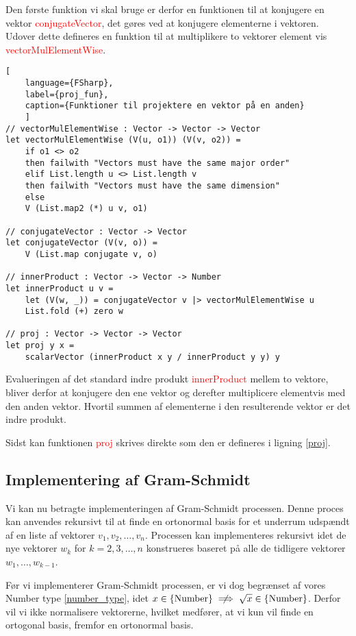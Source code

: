 Den første funktion vi skal bruge er derfor en funktionen til at konjugere en vektor \textcolor{red}{conjugateVector}, det gøres ved at konjugere elementerne i vektoren. Udover dette defineres en funktion til at multiplikere to vektorer element vis \textcolor{red}{vectorMulElementWise}. 

\begin{lstlisting}[
    language={FSharp}, 
    label={proj_fun}, 
    caption={Funktioner til projektere en vektor på en anden}
    ]
// vectorMulElementWise : Vector -> Vector -> Vector
let vectorMulElementWise (V(u, o1)) (V(v, o2)) =
    if o1 <> o2
    then failwith "Vectors must have the same major order"
    elif List.length u <> List.length v 
    then failwith "Vectors must have the same dimension"
    else
    V (List.map2 (*) u v, o1)

// conjugateVector : Vector -> Vector
let conjugateVector (V(v, o)) = 
    V (List.map conjugate v, o)

// innerProduct : Vector -> Vector -> Number
let innerProduct u v =
    let (V(w, _)) = conjugateVector v |> vectorMulElementWise u
    List.fold (+) zero w

// proj : Vector -> Vector -> Vector   
let proj y x =
    scalarVector (innerProduct x y / innerProduct y y) y
\end{lstlisting}

Evalueringen af det standard indre produkt \textcolor{red}{innerProduct} mellem to vektore, bliver derfor at konjugere den ene vektor og derefter multiplicere elementvis med den anden vektor. Hvortil summen af elementerne i den resulterende vektor er det indre produkt.

Sidst kan funktionen \textcolor{red}{proj} skrives direkte som den er defineres i ligning \ref{proj}.


\subsection{Implementering af Gram-Schmidt}
Vi kan nu betragte implementeringen af Gram-Schmidt processen. Denne proces kan anvendes rekursivt til at finde en ortonormal basis for et underrum udspændt af en liste af vektorer $v_1, v_2, \ldots, v_n$. Processen kan implementeres rekursivt idet de nye vektorer $w_k$ for $k = 2, 3, \ldots, n$ konstrueres baseret på alle de tidligere vektorer $w_1, \ldots, w_{k-1}$. 

Før vi implementerer Gram-Schmidt processen, er vi dog begrænset af vores Number type \ref{number_type}, idet $x \in \text{\{Number\}} \centernot\implies \sqrt{x} \in \text{\{Number\}}$. Derfor vil vi ikke normalisere vektorerne, hvilket medfører, at vi kun vil finde en ortogonal basis, fremfor en ortonormal basis.

